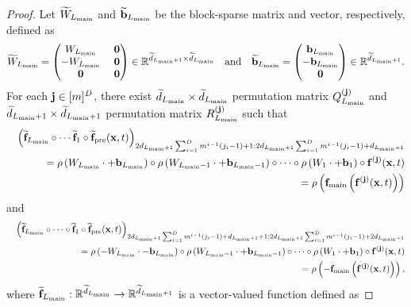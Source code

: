 \documentclass[twoside,11pt]{article}
\newcommand{\bb}{{\bf b}}
\newcommand{\bff}{{\bf f}}
\newcommand{\bj}{{\bf j}}
\newcommand{\bx}{{\bf x}}
\newcommand{\bbR}{{\mathbb R}}
\newcommand{\bean}{\setlength\arraycolsep{1pt}\begin{eqnarray*}}
\newcommand{\eean}{\end{eqnarray*}}
\begin{document}
\begin{proof}
Let $\widetilde W_{L_{\rm main}}$ and $\widetilde \bb_{L_{\rm main}}$ be the block-sparse matrix and vector, respectively, defined as
\bean
\widetilde W_{L_{\rm main}} = 
\begin{pmatrix}
W_{L_{\rm main}} & \  \mathbf{0}
\\
-W_{L_{\rm main}} & \ \mathbf{0}
\\
\mathbf{0} & \ \mathbf{0}
\end{pmatrix} \in \bbR^{\widetilde d_{L_{\rm main}+1 } \times \widetilde d_{L_{\rm main}}}
\quad \text{and} \quad
\widetilde \bb_{L_{\rm main}} = 
\begin{pmatrix}
\bb_{L_{\rm main}} 
\\
-\bb_{L_{\rm main}} 
\\
\mathbf{0}
\end{pmatrix} \in \bbR^{\widetilde d_{L_{\rm main}+1 } }.
\eean
For each $\bj \in [m]^{D}$, there exist $\widetilde d_{L_{\rm main}} \times \widetilde d_{L_{\rm main}}$ permutation matrix $Q_{L_{\rm main}}^{(\bj)}$  and  $\widetilde d_{L_{\rm main}+1} \times \widetilde d_{L_{\rm main}+1}$ permutation matrix $R_{L_{\rm main}}^{(\bj)}$ such that
\bean
&& \left(\widetilde \bff_{L_{\rm main}} \circ  \cdots  \widetilde \bff_{1} \circ \widetilde \bff_{\rm pre}(\bx,t) \right)   _{ 2d_{L_{\rm main}+1} \sum_{i=1}^{D}  m^{i-1} ( j_{i}-1) +1 : 2d_{L_{\rm main}+1}  \sum_{i=1}^{D}  m^{i-1}( j_{i}-1) +d_{L_{\rm main}+1}  }
\\
&& \quad =  \rho \left( W_{L_{\rm main}} \cdot +  \bb_{L_{\rm main}} \right) \circ  \rho \left(  W_{L_{\rm main}-1} \cdot +  \bb_{L_{\rm main}-1} \right) \circ \cdots \circ
\rho \left(  W_{1} \cdot  +  \bb_{1} \right) \circ \bff^{( \bj )}(\bx,t)
\\
&& \quad = \rho \left( \bff_{\rm main}\left( \bff^{(\bj)}(\bx,t) \right)\right)
\eean
and
\bean
&& \left( \widetilde \bff_{L_{\rm main}} \circ  \cdots \circ  \widetilde \bff_{1} \circ \widetilde \bff_{\rm pre}(\bx,t) \right)_{ 2d_{L_{\rm main}+1} \sum_{i=1}^{D}  m^{i-1} ( j_{i}-1) + d_{L_{\rm main}+1} +1 : 2d_{L_{\rm main}+1}  \sum_{i=1}^{D}  m^{i-1}( j_{i}-1) + 2d_{L_{\rm main}+1}  }
\\
&& \quad  =  \rho \left( - W_{L_{\rm main}} \cdot -  \bb_{L_{\rm main}} \right) \circ  \rho \left(  W_{L_{\rm main}-1} \cdot +  \bb_{L_{\rm main}-1} \right) \circ \cdots \circ
\rho \left(  W_{1} \cdot  +  \bb_{1} \right) \circ \bff^{( \bj )}(\bx,t)
\\
&& \quad = \rho \left( - \bff_{\rm main}\left( \bff^{(\bj)}(\bx,t) \right) \right),
\eean
where
 $\widetilde \bff_{L_{\rm main}} : \bbR^{\widetilde d_{L_{\rm main}}} \rightarrow \bbR^{\widetilde d_{L_{\rm main}+1}}$ is a vector-valued function defined as

\end{proof}
\end{document}

